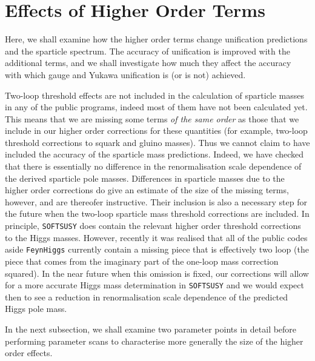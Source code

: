\documentclass[final,3p,times,pdflatex]{elsarticle}
\begin{document}
\section{Effects of Higher Order Terms \label{sec:results}}
Here, we shall examine how the higher order terms change unification
predictions and the sparticle spectrum. The accuracy of unification is
improved with the additional terms, and we shall investigate how much they
affect the accuracy with which gauge and Yukawa unification is (or is not)
achieved. 

Two-loop threshold effects
are not included in the calculation of sparticle masses in any of the public
programs, indeed most of them have not been calculated yet. This means that 
we are missing some terms {\em of the same order}\/ as those that we include 
in our higher order corrections for these quantities (for example, two-loop
threshold corrections to squark and gluino masses). Thus we cannot claim to
have included the accuracy of the sparticle mass predictions. Indeed, we have
checked that there is essentially no difference in the renormalisation scale
dependence of the derived sparticle pole masses. 
Differences in
sparticle masses due to the higher order corrections do give an estimate of
the size of the missing terms, however, and are thereofer instructive. 
Their inclusion is also a necessary step for the future when the two-loop
sparticle mass threshold corrections are included. 
In principle, {\tt SOFTSUSY} does contain the relevant higher order threshold
corrections to the Higgs masses. However, recently it was realised that all of
the public codes aside {\tt FeynHiggs} currently contain a missing piece that
is effectively two loop (the piece that comes from the imaginary part of the
one-loop mass correction squared). In the near future when this omission is
fixed, 
our corrections will allow for a more accurate Higgs mass determination in
{\tt SOFTSUSY} and we would expect then to see a reduction in renormalisation
scale dependence of the predicted Higgs pole mass.

In the next subsection, we shall examine two parameter points in detail
before performing parameter scans to characterise more generally the size of
the higher order effects.
\end{document}

